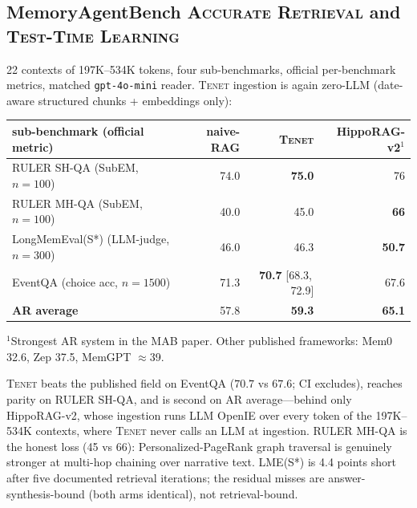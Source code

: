 \documentclass[11pt]{article}
\newcommand{\tenet}{\textsc{Tenet}}
\newcommand{\ci}[2]{{\footnotesize[#1,\,#2]}}
\begin{document}
\subsection{MemoryAgentBench \textsc{Accurate Retrieval} and \textsc{Test-Time Learning}}\label{sec:mab}
22 contexts of 197K--534K tokens, four sub-benchmarks, official per-benchmark metrics,
matched \texttt{gpt-4o-mini} reader. \tenet{} ingestion is again zero-LLM (date-aware
structured chunks + embeddings only):

\begin{center}
\small
\begin{tabular}{lrrr}
\toprule
sub-benchmark (official metric) & naive-RAG & \tenet{} & HippoRAG-v2$^{1}$\\
\midrule
RULER SH-QA (SubEM, $n{=}100$) & 74.0 & \textbf{75.0} & 76\\
RULER MH-QA (SubEM, $n{=}100$) & 40.0 & 45.0 & \textbf{66}\\
LongMemEval(S*) (LLM-judge, $n{=}300$) & 46.0 & 46.3 & \textbf{50.7}\\
EventQA (choice acc, $n{=}1500$) & 71.3 & \textbf{70.7} \ci{68.3}{72.9} & 67.6\\
\midrule
\textbf{AR average} & 57.8 & \textbf{59.3} & \textbf{65.1}\\
\bottomrule
\end{tabular}

$^{1}$Strongest AR system in the MAB paper. Other published frameworks: Mem0 32.6,
Zep 37.5, MemGPT $\approx$39.
\end{center}

\tenet{} beats the published field on EventQA ($70.7$ vs $67.6$; CI excludes), reaches
parity on RULER SH-QA, and is second on AR average---behind only HippoRAG-v2, whose
ingestion runs LLM OpenIE over every token of the 197K--534K contexts, where \tenet{}
never calls an LLM at ingestion. RULER MH-QA is the honest loss (45 vs 66):
Personalized-PageRank graph traversal is genuinely stronger at multi-hop chaining over
narrative text. LME(S*) is 4.4 points short after five documented retrieval iterations;
the residual misses are answer-synthesis-bound (both arms identical), not
retrieval-bound.
\end{document}
